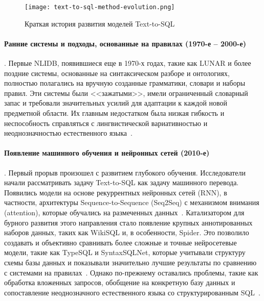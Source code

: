 \begin{figure}[!htb]
	\centering
	\texttt{[image: text-to-sql-method-evolution.png]}
	\caption{Краткая история развития моделей Text-to-SQL}
	\label{fig:text-to-sql-method-evolution}
\end{figure}

\paragraph{Ранние системы и подходы, основанные на правилах (1970-е – 2000-е)}. Первые NLIDB,
появившиеся еще в 1970-х годах, такие как LUNAR и более поздние системы,
основанные на синтаксическом разборе и онтологиях, полностью полагались на вручную созданные грамматики,
словари и наборы правил. Эти системы были <<зажатыми>>, имели ограниченный словарный запас и
требовали значительных усилий для адаптации к каждой новой предметной области.
Их главным недостатком была низкая гибкость и неспособность справляться с лингвистической вариативностью и
неоднозначностью естественного языка~\cite{karimiNonEnglishNaturalLanguage2022,
	pazosr.ComparativeStudyCustomization2016, kimNaturalLanguageSQL2020,
	bradDatasetNeuralNatural2017, mohammadjafariNaturalLanguageSQL2025}.

\paragraph{Появление машинного обучения и нейронных сетей (2010-е)}. Первый прорыв произошел с
развитием глубокого обучения. Исследователи начали рассматривать задачу Text-to-SQL как задачу
машинного перевода. Появились модели на основе рекуррентных нейронных сетей (RNN), в частности,
архитектуры Sequence-to-Sequence (Seq2Seq) с механизмом внимания (attention),
которые обучались на размеченных данных~\cite{bradDatasetNeuralNatural2017, visperasModernTexttoSQLSemantic2023}.
Катализатором для бурного развития этого направления стало появление крупных аннотированных
наборов данных, таких как WikiSQL и, в особенности, Spider.
Это позволило создавать и объективно сравнивать более сложные и точные нейросетевые модели,
такие как TypeSQL и SyntaxSQLNet, которые учитывали структуру схемы базы данных и
показывали значительно лучшие результаты по сравнению с системами
на правилах~\cite{kimNaturalLanguageSQL2020, visperasModernTexttoSQLSemantic2023}.
Однако по-прежнему оставались проблемы, такие как обработка вложенных запросов,
обобщение на конкретную базу данных и сопоставление неоднозначного естественного языка со структурированным
SQL~\cite{mohammadjafariNaturalLanguageSQL2025}.

